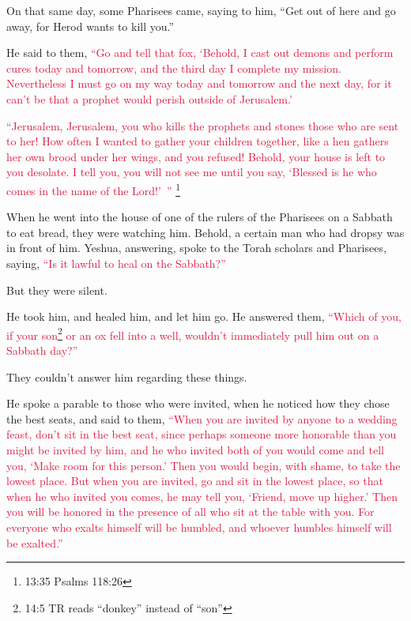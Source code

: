 \myverse{}On that same day, some Pharisees came, saying to him, “Get out
of here and go away, for Herod wants to kill you.”

\myverse{}He said to them,
\textcolor{crimson}{“Go and tell that fox, ‘Behold, I cast out demons and perform cures today and tomorrow, and the third
	day I complete my mission.
}
\myverse{}\textcolor{crimson}{Nevertheless I must go on my way today and tomorrow and the next day,
	for it can’t be that a prophet would perish outside of Jerusalem.’}

\myverse{}\textcolor{crimson}{“Jerusalem, Jerusalem, you who kills the prophets and stones
	those who are sent to her! How often I wanted to gather your children together, like a hen gathers her
	own brood under her wings, and you refused!
}
\myverse{}\textcolor{crimson}{Behold, your house is left to you desolate. I tell you, you will not
	see me until you say, ‘Blessed is he who comes in the name of the Lord!’ ”
}\footnote{ 13:35 Psalms 118:26}


\mychapter{} \myverse*{}When he went into the house of one of the rulers of the Pharisees
on a Sabbath to eat bread, they were watching him.
\myverse{}Behold, a certain man who had dropsy was in front of him.
\myverse{}Yeshua, answering, spoke to the Torah scholars and Pharisees, saying,
\textcolor{crimson}{“Is it lawful to heal on the Sabbath?”}

\myverse{}But they were silent.

He took him, and healed him, and let him go.
\myverse{}He answered them,
\textcolor{crimson}{“Which of you, if your son}\footnote{14:5 TR reads “donkey” instead of “son”}
\textcolor{crimson}{or an ox fell into a well, wouldn’t immediately pull him out on a Sabbath day?”}

\myverse{}They couldn’t answer him regarding these things.

\myverse{}He spoke a parable to those who were invited, when he noticed
how they chose the best seats, and said to them,
\myverse{}\textcolor{crimson}{“When you are invited by anyone to a wedding feast, don’t sit in the best
	seat, since perhaps someone more honorable than you might be invited by him,
}
\myverse{}\textcolor{crimson}{and he who invited both of you would come and tell you, ‘Make room for
	this person.’ Then you would begin, with shame, to take the lowest place.
}
\myverse{}\textcolor{crimson}{But when you are invited, go and sit in the lowest place, so that when
	he who invited you comes, he may tell you, ‘Friend, move up higher.’ Then you will be honored in the presence
	of all who sit at the table with you.
}
\myverse{}\textcolor{crimson}{For everyone who exalts himself will be humbled, and whoever humbles
	himself will be exalted.”}

